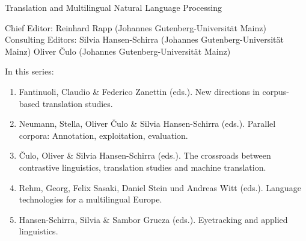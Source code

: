 {\large Translation and Multilingual Natural Language Processing}

\bigskip

Chief Editor: Reinhard Rapp (Johannes Gutenberg-Universität Mainz) \\
Consulting Editors: Silvia Hansen-Schirra (Johannes Gutenberg-Universität Mainz)
Oliver Čulo (Johannes Gutenberg-Universität Mainz)

\bigskip

In this series:

\begin{enumerate}
\item Fantinuoli, Claudio \& Federico Zanettin (eds.). New directions in corpus-based translation studies.
\item Neumann, Stella, Oliver Čulo \& Silvia Hansen-Schirra (eds.). Parallel corpora: Annotation, exploitation, evaluation.
\item Čulo, Oliver  \& Silvia Hansen-Schirra (eds.). The crossroads between contrastive linguistics, translation studies and machine translation.
\item Rehm, Georg, Felix Sasaki, Daniel Stein und Andreas Witt (eds.). Language technologies for a multilingual Europe. 
\item Hansen-Schirra, Silvia \& Sambor Grucza (eds.). Eyetracking and applied linguistics.
\end{enumerate}

 